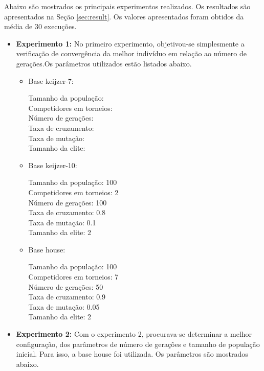 \documentclass[12pt]{article}
\begin{document}
Abaixo são mostrados os principais experimentos realizados. Os resultados são apresentados
na Seção \ref{sec:result}. Os valores apresentados foram obtidos da média de 30 execuções.

\begin{itemize}
 \item \textbf{Experimento 1:} No primeiro experimento, objetivou-se simplesmente a verificação
 de convergência da melhor indivíduo em relação ao número de gerações.Os parâmetros utilizados
 estão listados abaixo. \\
 
 \begin{itemize}
  \item Base keijzer-7:
  
  Tamanho da população: \\
  Competidores em torneios: \\
  Número de gerações: \\
  Taxa de cruzamento: \\
  Taxa de mutação: \\
  Tamanho da elite: \\
 
  \item Base keijzer-10:
  
  Tamanho da população: 100\\
  Competidores em torneios: 2\\
  Número de gerações: 100\\
  Taxa de cruzamento: 0.8\\
  Taxa de mutação: 0.1\\
  Tamanho da elite: 2\\
  
  \item Base house:
  
  Tamanho da população: 100\\
  Competidores em torneios: 7\\
  Número de gerações: 50\\
  Taxa de cruzamento: 0.9\\
  Taxa de mutação: 0.05\\
  Tamanho da elite: 2\\
  
 \end{itemize}
 
 \item \textbf{Experimento 2:} Com o experimento 2, procurava-se determinar a melhor configuração,
 dos parâmetros de número de gerações e tamanho de população inicial. Para isso, a base house foi
 utilizada. Os parâmetros são mostrados abaixo.
 

\end{itemize}
\end{document}

